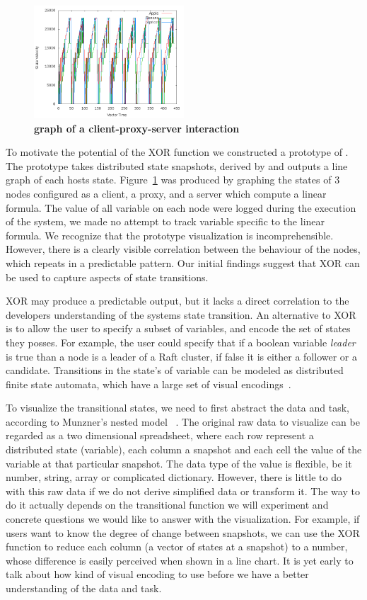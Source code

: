 \begin{figure}[t]
    \includegraphics[width=0.50\textwidth]{fig/plot}
    \caption{\textbf{\dviz graph of a client-proxy-server interaction}}
\label{fig:plot} 
\end{figure}

To motivate the potential of the XOR function we constructed a prototype of \dviz. The prototype takes distributed state snapshots, derived by \dinv and outputs a line graph of each hosts state. Figure~\ref{fig:plot} was produced by graphing the states of 3 nodes configured as a client, a proxy, and a server which compute a linear formula. The value of all variable on each node were logged during the execution of the system, we made no attempt to track variable specific to the linear formula. We recognize that the prototype visualization is incomprehensible. However, there is a clearly visible correlation between the behaviour of the nodes, which repeats in a predictable pattern. Our initial findings suggest that XOR can be used to capture aspects of state transitions.

XOR may produce a predictable output, but it lacks a direct correlation to the developers understanding of the systems state transition. An alternative to XOR is to allow the user to specify a subset of variables, and encode the set of states they posses. For example, the user could specify that if a boolean variable \textit{leader} is true than a node is a leader of a Raft cluster, if false it is either a follower or a candidate. Transitions in the state's of variable can be modeled as distributed finite state automata, which have a large set of visual encodings~\cite{DBLP:journals/corr/abs-1110-4161}.


To visualize the transitional states, we need to first abstract the 
data and task, according to Munzner's nested model ~\cite{munzner2009nested}.
The original raw data to visualize can be regarded as a two dimensional 
spreadsheet, where each row represent a distributed state (variable),
 each column a snapshot and each cell the value of the variable at
 that particular snapshot.  The data type of the value is flexible,
 be it number, string, array or complicated dictionary.
However, there is little to do with this raw data if we do not derive
simplified data or transform it.  The way to do it actually depends on 
the transitional function we will experiment and concrete questions we
would like to answer with the visualization.  For example, if users want
to know the degree of change between snapshots, we can use the XOR function
to reduce each column (a vector of states at a snapshot) to a number,
whose difference is easily perceived when shown in a line chart.
It is yet early to talk about how kind of visual encoding to use before
we have a better understanding of the data and task.